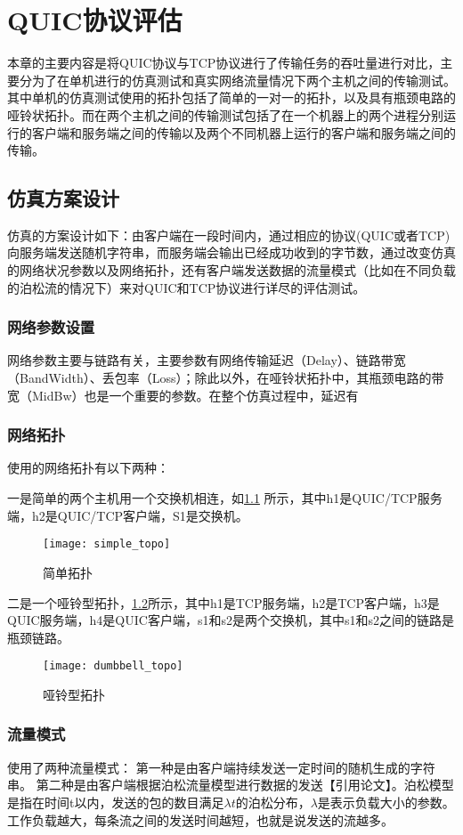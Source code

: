 \chapter{QUIC协议评估}

\label{cha:evaluation}
本章的主要内容是将QUIC协议与TCP协议进行了传输任务的吞吐量进行对比，主要分为了在单机进行的仿真测试和真实网络流量情况下两个主机之间的传输测试。其中单机的仿真测试使用的拓扑包括了简单的一对一的拓扑，以及具有瓶颈电路的哑铃状拓扑。而在两个主机之间的传输测试包括了在一个机器上的两个进程分别运行的客户端和服务端之间的传输以及两个不同机器上运行的客户端和服务端之间的传输。

\section{仿真方案设计}
仿真的方案设计如下：由客户端在一段时间内，通过相应的协议(QUIC或者TCP)向服务端发送随机字符串，而服务端会输出已经成功收到的字节数，通过改变仿真的网络状况参数以及网络拓扑，还有客户端发送数据的流量模式（比如在不同负载的泊松流的情况下）来对QUIC和TCP协议进行详尽的评估测试。
\subsection{网络参数设置}
网络参数主要与链路有关，主要参数有网络传输延迟（Delay）、链路带宽（BandWidth）、丢包率（Loss）；除此以外，在哑铃状拓扑中，其瓶颈电路的带宽（MidBw）也是一个重要的参数。在整个仿真过程中，延迟有

\subsection{网络拓扑}
使用的网络拓扑有以下两种：

一是简单的两个主机用一个交换机相连，如\ref{fig:simpletopo} 所示，其中h1是QUIC/TCP服务端，h2是QUIC/TCP客户端，S1是交换机。
\begin{figure}
	\centering
	\texttt{[image: simple\_topo]}
	\caption{简单拓扑}
	\label{fig:simpletopo}
\end{figure}

二是一个哑铃型拓扑，\ref{fig:dumbbelltopo}所示，其中h1是TCP服务端，h2是TCP客户端，h3是QUIC服务端，h4是QUIC客户端，s1和s2是两个交换机，其中s1和s2之间的链路是瓶颈链路。
\begin{figure}
	\centering
	\texttt{[image: dumbbell\_topo]}
	\caption{哑铃型拓扑}
	\label{fig:dumbbelltopo}
\end{figure}

\subsection{流量模式}
使用了两种流量模式：
第一种是由客户端持续发送一定时间的随机生成的字符串。
第二种是由客户端根据泊松流量模型进行数据的发送【引用论文】。泊松模型是指在时间t以内，发送的包的数目满足$\lambda t$的泊松分布，$\lambda$是表示负载大小的参数。工作负载越大，每条流之间的发送时间越短，也就是说发送的流越多。

